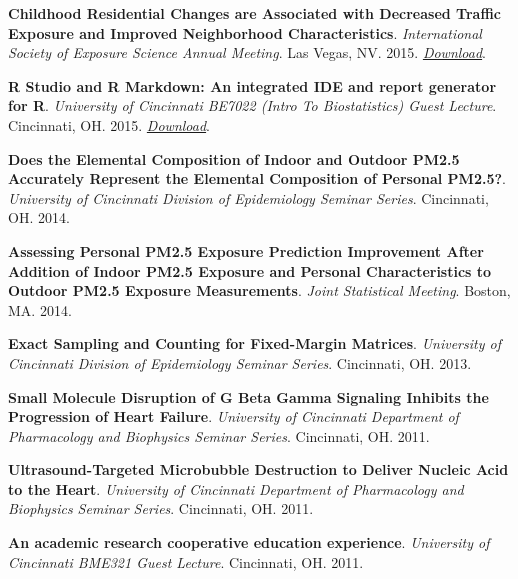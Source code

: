 \textbf{Childhood Residential Changes are Associated with Decreased
Traffic Exposure and Improved Neighborhood Characteristics}.
\emph{International Society of Exposure Science Annual Meeting}. Las
Vegas, NV. 2015.
\href{http://colebrokamp-website.s3.amazonaws.com/talks/Cole_Brokamp_ISES_2015.pdf}{\emph{Download}}.

\textbf{R Studio and R Markdown: An integrated IDE and report generator
for R}. \emph{University of Cincinnati BE7022 (Intro To Biostatistics)
Guest Lecture}. Cincinnati, OH. 2015.
\href{http://colebrokamp-website.s3.amazonaws.com/talks/RStudio_and_RMarkdown.pdf}{\emph{Download}}.

\textbf{Does the Elemental Composition of Indoor and Outdoor PM2.5
Accurately Represent the Elemental Composition of Personal PM2.5?}.
\emph{University of Cincinnati Division of Epidemiology Seminar Series}.
Cincinnati, OH. 2014.

\textbf{Assessing Personal PM2.5 Exposure Prediction Improvement After
Addition of Indoor PM2.5 Exposure and Personal Characteristics to
Outdoor PM2.5 Exposure Measurements}. \emph{Joint Statistical Meeting}.
Boston, MA. 2014.

\textbf{Exact Sampling and Counting for Fixed-Margin Matrices}.
\emph{University of Cincinnati Division of Epidemiology Seminar Series}.
Cincinnati, OH. 2013.

\textbf{Small Molecule Disruption of G Beta Gamma Signaling Inhibits the
Progression of Heart Failure}. \emph{University of Cincinnati Department
of Pharmacology and Biophysics Seminar Series}. Cincinnati, OH. 2011.

\textbf{Ultrasound-Targeted Microbubble Destruction to Deliver Nucleic
Acid to the Heart}. \emph{University of Cincinnati Department of
Pharmacology and Biophysics Seminar Series}. Cincinnati, OH. 2011.

\textbf{An academic research cooperative education experience}.
\emph{University of Cincinnati BME321 Guest Lecture}. Cincinnati, OH.
2011.
